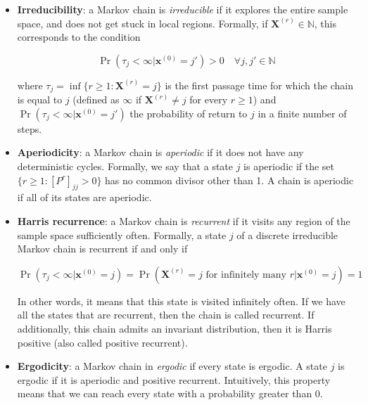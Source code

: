 \documentclass[12pt]{memoir}
\newcommand{\mb}{\mathbf}
\newcommand{\tb}{\textbf}
\newcommand{\ti}{\textit}
\begin{document}
\begin{itemize}

    \item \tb{Irreducibility}: a Markov chain is \ti{irreducible} if it explores the entire sample space, and does not get stuck in local regions. Formally, if $\mb X^{(r)}\in \mathbb{N}$, this corresponds to the condition

    \begin{equation}
        \Pr(\tau_j < \infty | \mb x^{(0)} = j') > 0\quad \forall j,j' \in \mathbb{N}
    \end{equation}

    where $\tau_j = \inf\{r\geq 1: \mb X^{(r)} = j\}$ is the first passage time for which the chain is equal to $j$ (defined as $\infty$ if $\mb X^{(r)} \neq j$ for every $r\geq 1$) and $\Pr(\tau_j < \infty | \mb x^{(0)} = j')$ the probability of return to $j$ in a finite number of steps.

    \item \tb{Aperiodicity}: a Markov chain is \ti{aperiodic} if it does not have any deterministic cycles. Formally, we say that a state $j$ is aperiodic if the set $\{r\geq1: [P^r]_{jj} > 0\}$ has no common divisor other than 1. A chain is aperiodic if all of its states are aperiodic.

    \item \tb{Harris recurrence}:  a Markov chain is \ti{recurrent} if it visits any region of the sample space sufficiently often. Formally, a state $j$ of a discrete irreducible Markov chain is recurrent if and only if

    \begin{equation}
        \Pr(\tau_j < \infty |\mb x^{(0)} = j) = \Pr(\mb X^{(r)} = j \text{ for infinitely many } r | \mb x^{(0)}=j) = 1
    \end{equation}

    In other words, it means that this state is visited infinitely often. If we have all the states that are recurrent, then the chain is called recurrent. If additionally, this chain admits an invariant distribution, then it is Harris positive (also called positive recurrent).

    \item \tb{Ergodicity}: a Markov chain in \ti{ergodic} if every state is ergodic. A state $j$ is ergodic if it is aperiodic and positive recurrent. Intuitively, this property means that we can reach every state with a probability greater than 0.

\end{itemize}
\end{document}
